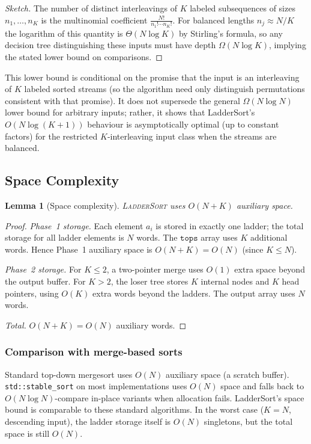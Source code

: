 \documentclass[12pt,a4paper]{article}
\theoremstyle{plain}
\newtheorem{lemma}[theorem]{Lemma}
\theoremstyle{definition}
\newcommand{\tops}{\texttt{tops}}
\begin{document}
\begin{proof}[Sketch]
The number of distinct interleavings of $K$ labeled subsequences of sizes
$n_1,\dots,n_K$ is the multinomial coefficient
\(\frac{N!}{n_1!\cdots n_K!}\).  For balanced lengths $n_j\approx N/K$ the
logarithm of this quantity is $\Theta(N\log K)$ by Stirling's formula, so
any decision tree distinguishing these inputs must have depth
\(\Omega(N\log K)\), implying the stated lower bound on comparisons.
\end{proof}

This lower bound is conditional on the promise that the input is an
interleaving of $K$ labeled sorted streams (so the algorithm need only
distinguish permutations consistent with that promise).  It does not
supersede the general $\Omega(N\log N)$ lower bound for arbitrary inputs;
rather, it shows that LadderSort's $O(N\log(K+1))$ behaviour is asymptotically
optimal (up to constant factors) for the restricted $K$-interleaving input
class when the streams are balanced.

\subsection{Space Complexity}
\label{sec:space}

\begin{lemma}[Space complexity]
\label{lem:space}
\textsc{LadderSort} uses $O(N + K)$ auxiliary space.
\end{lemma}

\begin{proof}
\emph{Phase~1 storage.}  Each element $a_i$ is stored in exactly one
ladder; the total storage for all ladder elements is $N$ words.  The
$\tops$ array uses $K$ additional words.  Hence Phase~1 auxiliary space
is $O(N + K) = O(N)$ (since $K \le N$).

\emph{Phase~2 storage.}  For $K \le 2$, a two-pointer merge uses $O(1)$
extra space beyond the output buffer.  For $K > 2$, the loser tree
stores $K$ internal nodes and $K$ head pointers, using $O(K)$ extra words
beyond the ladders.  The output array uses $N$ words.

\emph{Total.}  $O(N + K) = O(N)$ auxiliary words.
\end{proof}

\subsubsection{Comparison with merge-based sorts}
Standard top-down mergesort uses $O(N)$ auxiliary space (a scratch buffer).
\texttt{std::stable\_sort} on most implementations uses $O(N)$ space and
falls back to $O(N \log N)$-compare in-place variants when allocation fails.
LadderSort's space bound is comparable to these standard algorithms.
In the worst case ($K = N$, descending input), the ladder storage itself
is $O(N)$ singletons, but the total space is still $O(N)$.
\end{document}
